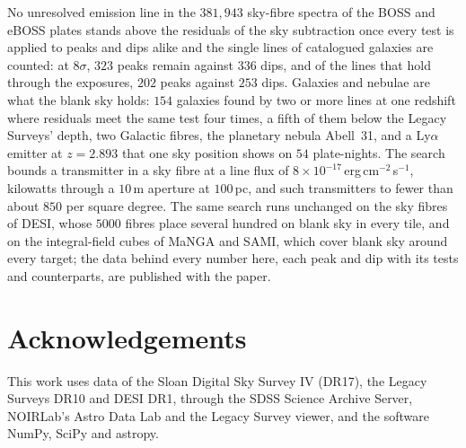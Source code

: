 \documentclass[3p,11pt]{elsarticle}
\newcommand{\flux}{erg\,cm$^{-2}$\,s$^{-1}$}
\begin{document}
No unresolved emission line in the $381{,}943$ sky-fibre spectra of the BOSS and eBOSS
plates stands above the residuals of the sky subtraction once every test is applied to
peaks and dips alike and the single lines of catalogued galaxies are counted: at
$8\sigma$, $323$ peaks remain against $336$ dips, and of the lines that hold through the
exposures, $202$ peaks against $253$ dips. Galaxies and nebulae are what the blank sky
holds: $154$ galaxies found by two or more lines at one redshift where residuals meet the
same test four times, a fifth of them below the Legacy Surveys' depth, two Galactic fibres,
the planetary nebula Abell~31, and a Ly$\alpha$ emitter at $z=2.893$ that one sky position
shows on $54$ plate-nights. The search bounds a transmitter in a sky fibre at a line flux of
$8\times10^{-17}$\,\flux, kilowatts through a $10$\,m aperture at $100$\,pc, and such
transmitters to fewer than about $850$ per square degree. The same search runs unchanged
on the sky fibres of DESI, whose $5000$ fibres place several hundred on blank sky in
every tile, and on the integral-field cubes of MaNGA and SAMI, which cover blank sky
around every target; the data behind every number here, each peak and dip with its tests
and counterparts, are published with the paper.

\section*{Acknowledgements}

This work uses data of the Sloan Digital Sky Survey IV (DR17), the Legacy Surveys DR10
and DESI DR1, through the SDSS Science Archive Server, NOIRLab's Astro Data Lab and the
Legacy Survey viewer, and the software NumPy, SciPy and astropy.
\end{document}
